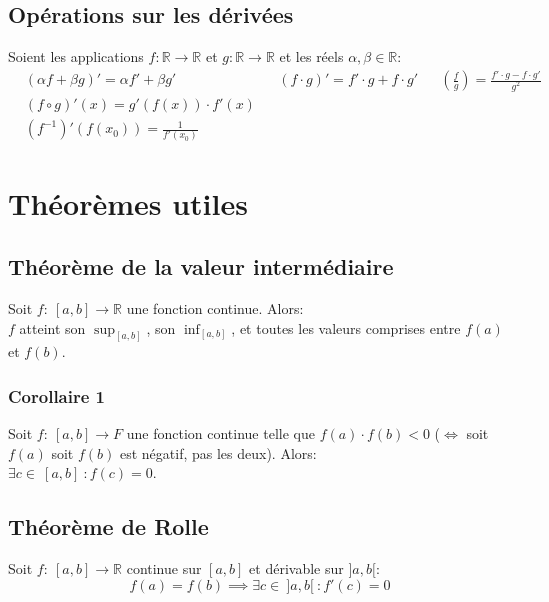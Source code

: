 \documentclass{article}
\begin{document}
\subsection{Opérations sur les dérivées}
Soient les applications \(f: \mathbb{R} \to \mathbb{R}\) et \(g: \mathbb{R} \to \mathbb{R}\) et les réels \(\alpha, \beta \in \mathbb{R}\):
\begin{align*}
	&(\alpha f + \beta g)' = \alpha f' + \beta g' 
		& &(f \cdot g)' = f' \cdot g + f \cdot g' 
			& &\left (\frac{f}{g}\right ) = \frac{f' \cdot g - f \cdot g'}{g^2} \\ 
	&(f \circ g)'(x) = g'(f(x)) \cdot f'(x) \\
	&(f^{-1})' (f(x_0))  = \frac{1}{f'(x_0)} %
\end{align*}


\section{Théorèmes utiles}

\subsection{Théorème de la valeur intermédiaire}
Soit \(f : \ [a, b] \to \mathbb{R}\) une fonction continue. Alors: \\
\(f\) atteint son \(\sup_{[a, b]}\), son \(\inf_{[a, b]}\), et toutes les valeurs comprises entre \(f(a)\) et \(f(b)\).

\subsubsection{Corollaire 1}
Soit \(f : \ [a, b] \to F\) une fonction continue telle que \(f(a) \cdot f(b) < 0\) (\(\iff\) soit \(f(a)\) soit \(f(b)\) est négatif, pas les deux). Alors: \\
\(\exists c \in \ [a, b] \ : f(c) = 0\).

\subsection{Théorème de Rolle}
Soit \(f : \ [a, b] \to \mathbb{R}\) continue sur \([a, b]\) et dérivable sur \(]a, b[\):
\begin{equation*}
	f(a) = f(b) \implies \exists c \in \ ]a, b[ \ : f'(c) = 0
\end{equation*}
\end{document}
